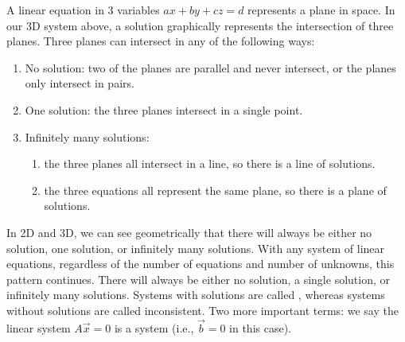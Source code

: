 A linear equation in 3 variables $ax+by+cz=d$ represents a plane in space.  
In our 3D system above, a solution graphically represents the intersection of three planes. 
Three planes can intersect in any of the following ways:
\begin{enumerate}
\item No solution: two of the planes are parallel and never intersect,
  or the planes only intersect in pairs.
\item One solution: the three planes intersect in a single point.
\item Infinitely many solutions:
\begin{enumerate}
	\item the three planes all intersect in a line, so there is a line of solutions.
	\item the three equations all represent the same plane, so there is a plane of solutions.
\end{enumerate}
\end{enumerate}
%
In 2D and 3D, we can see geometrically that there will always be either
no solution, one solution, or infinitely many solutions.
With any system of linear equations, regardless of the number of equations and number of unknowns, this pattern continues. 
There will always be either no solution, a single solution, or infinitely many solutions.
Systems with solutions are called ,
whereas systems without solutions are called inconsistent.
Two more important terms: we say the linear system {$A\vec x = 0$} is a  system (i.e., $\vec b=0$ in this case).

